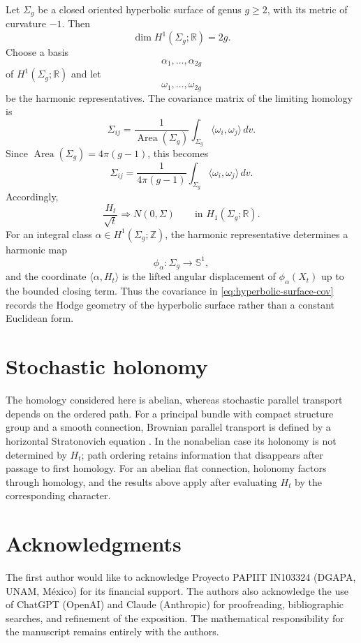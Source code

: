 \documentclass[a4paper,reqno]{amsart}
\newcommand{\R}{\mathbb R}
\newcommand{\Z}{\mathbb Z}
\newcommand{\Sph}{\mathbb S}
\theoremstyle{definition}
\begin{document}
Let $\Sigma_g$ be a closed oriented hyperbolic surface of genus $g\ge2$, with its metric of curvature $-1$.  Then
\[
   \dim H^1(\Sigma_g;\R)=2g.
\]
Choose a basis
\[
   \alpha_1,\ldots,\alpha_{2g}
\]
of $H^1(\Sigma_g;\R)$ and let
\[
   \omega_1,\ldots,\omega_{2g}
\]
be the harmonic representatives.  The covariance matrix of the limiting homology is
\begin{equation}\label{eq:hyperbolic-surface-cov}
   \Sigma_{ij}
   =\frac{1}{\operatorname{Area}(\Sigma_g)}
     \int_{\Sigma_g}\langle\omega_i,\omega_j\rangle\,dv.
\end{equation}
Since $\operatorname{Area}(\Sigma_g)=4\pi(g-1)$, this becomes
\[
   \Sigma_{ij}
   =\frac{1}{4\pi(g-1)}
     \int_{\Sigma_g}\langle\omega_i,\omega_j\rangle\,dv.
\]
Accordingly,
\[
   \frac{H_t}{\sqrt t}
   \Longrightarrow N(0,\Sigma)
   \qquad\text{in }H_1(\Sigma_g;\R).
\]
For an integral class $\alpha\in H^1(\Sigma_g;\Z)$, the harmonic representative determines a harmonic map
\[
   \phi_\alpha:\Sigma_g\to\Sph^1,
\]
and the coordinate $\langle\alpha,H_t\rangle$ is the lifted angular displacement of $\phi_\alpha(X_t)$ up to the bounded closing term.  Thus the covariance in \eqref{eq:hyperbolic-surface-cov} records the Hodge geometry of the hyperbolic surface rather than a constant Euclidean form.

\section{Stochastic holonomy}

The homology considered here is abelian, whereas stochastic parallel transport depends on the ordered path.  For a principal bundle with
compact structure group and a smooth connection, Brownian parallel transport
is defined by a horizontal Stratonovich equation \cite{Ito1963,Emery}.  In the
nonabelian case its holonomy is not determined by $H_t$; path ordering retains
information that disappears after passage to first homology.  For an abelian
flat connection, holonomy factors through homology, and the
results above apply after evaluating $H_t$ by the corresponding character.

\section*{Acknowledgments}

The first author would like to acknowledge Proyecto PAPIIT IN103324
(DGAPA, UNAM, M\'exico) for its financial support.  The authors also
acknowledge the use of ChatGPT (OpenAI) and Claude (Anthropic) for
proofreading, bibliographic searches, and refinement of the exposition.
The mathematical responsibility for the manuscript remains entirely
with the authors.
\end{document}
